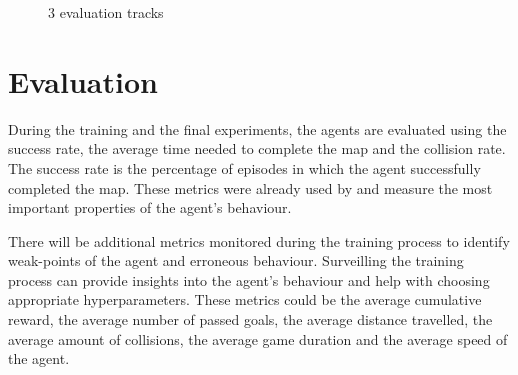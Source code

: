 \begin{figure}
    \centering
         \qquad
         \qquad
         \qquad
    \caption{3 evaluation tracks}
    \label{fig:3tracks}
\end{figure}

\section{Evaluation}

During the training and the final experiments, the agents are evaluated using the success rate, the average time needed to complete the map and the collision rate. The success rate is the percentage of episodes in which the agent successfully completed the map. These metrics were already used by \autocite{maximilian} and measure the most important properties of the agent's behaviour.

There will be additional metrics monitored during the training process to identify weak-points of the agent and erroneous behaviour. Surveilling the training process can provide insights into the agent's behaviour and help with choosing appropriate hyperparameters.
These metrics could be the average cumulative reward, the average number of passed goals, the average distance travelled, the average amount of collisions, the average game duration and the average speed of the agent.



